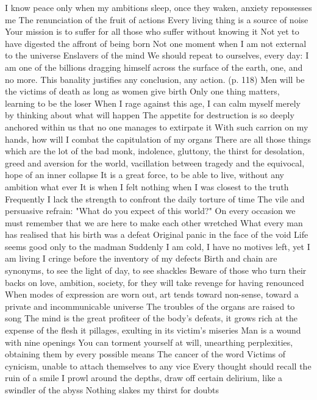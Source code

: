 \documentclass{article}
\begin{document}
I know peace only when my ambitions sleep, once they waken, anxiety repossesses me
The renunciation of the fruit of actions
Every living thing is a source of noise
Your mission is to suffer for all those who suffer without knowing it
Not yet to have digested the affront of being born
Not one moment when I am not external to the universe
Enslavers of the mind
We should repeat to ourselves, every day: I am one of the billions dragging himself across the surface of the earth, one, and no more. This banality justifies any conclusion, any action. (p. 118)
Men will be the victims of death as long as women give birth
Only one thing matters, learning to be the loser
When I rage against this age, I can calm myself merely by thinking about what will happen
The appetite for destruction is so deeply anchored within us that no one manages to extirpate it
With such carrion on my hands, how will I combat the capitulation of my organs
There are all those things which are the lot of the bad monk, indolence, gluttony, the thirst for desolation, greed and aversion for the world, vacillation between tragedy and the equivocal, hope of an inner collapse
It is a great force, to be able to live, without any ambition what ever
It is when I felt nothing when I was closest to the truth
Frequently I lack the strength to confront the daily torture of time
The vile and persuasive refrain: "What do you expect of this world?"
On every occasion we must remember that we are here to make each other wretched
What every man has realised that his birth was a defeat
Original panic in the face of the void
Life seems good only to the madman
Suddenly I am cold, I have no motives left, yet I am living
I cringe before the inventory of my defects
Birth and chain are synonyms, to see the light of day, to see shackles
Beware of those who turn their backs on love, ambition, society, for they will take revenge for having renounced
When modes of expression are worn out, art tends toward non-sense, toward a private and incommunicable universe
The troubles of the organs are raised to song
The mind is the great profiteer of the body's defeats, it grows rich at the expense of the flesh it pillages, exulting in its victim's miseries
Man is a wound with nine openings
You can torment yourself at will, unearthing perplexities, obtaining them by every possible means
The cancer of the word
Victims of cynicism, unable to attach themselves to any vice
Every thought should recall the ruin of a smile
I prowl around the depths, draw off certain delirium, like a swindler of the abyss
Nothing slakes my thirst for doubts
\end{document}
